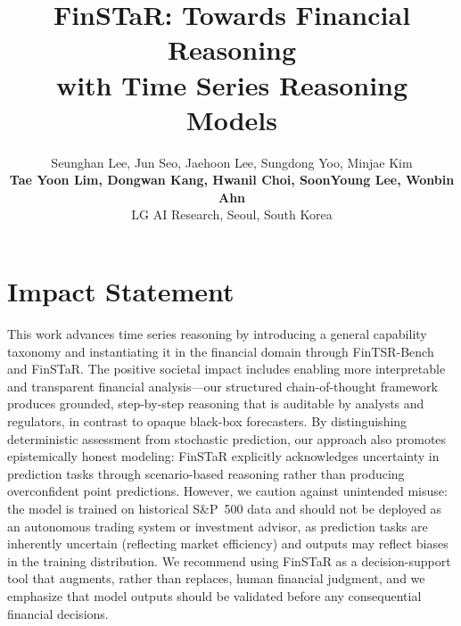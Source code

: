 \documentclass{article}
\title{FinSTaR: Towards Financial Reasoning \\ with Time Series Reasoning Models}
\author{
Seunghan Lee, Jun Seo, Jaehoon Lee, Sungdong Yoo, Minjae Kim \\
\textbf{Tae Yoon Lim, Dongwan Kang, Hwanil Choi, SoonYoung Lee, Wonbin Ahn} \\
LG AI Research, Seoul, South Korea
}
\begin{document}
\maketitle











\section*{Impact Statement}
This work advances time series reasoning by introducing a general capability taxonomy and instantiating it in the financial domain through FinTSR-Bench and FinSTaR. The positive societal impact includes enabling more interpretable and transparent financial analysis---our structured chain-of-thought framework produces grounded, step-by-step reasoning that is auditable by analysts and regulators, in contrast to opaque black-box forecasters. By distinguishing deterministic assessment from stochastic prediction, our approach also promotes epistemically honest modeling: FinSTaR explicitly acknowledges uncertainty in prediction tasks through scenario-based reasoning rather than producing overconfident point predictions. However, we caution against unintended misuse: the model is trained on historical S\&P~500 data and should not be deployed as an autonomous trading system or investment advisor, as prediction tasks are inherently uncertain (reflecting market efficiency) and outputs may reflect biases in the training distribution. We recommend using FinSTaR as a decision-support tool that augments, rather than replaces, human financial judgment, and we emphasize that model outputs should be validated before any consequential financial decisions.
  



\clearpage

  
\appendix
\renewcommand{\thefigure}{\thesection.\arabic{figure}}
\renewcommand{\thetable}{\thesection.\arabic{table}}


\newpage

\end{document}
